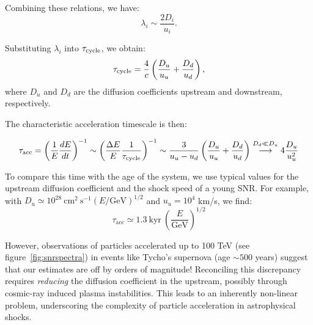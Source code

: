 Combining these relations, we have:
\[
\lambda_i \sim \frac{2 D_i}{u_i}.
\]

Substituting \( \lambda_i \) into \( \tau_{\rm cycle} \), we obtain:
\begin{equation}
\tau_{\rm cycle} = \frac{4}{c} \left( \frac{D_u}{u_u} + \frac{D_d}{u_d} \right),
\end{equation}
where \( D_u \) and \( D_d \) are the diffusion coefficients upstream and downstream, respectively.

The characteristic acceleration timescale is then:
%
\begin{remark}
\begin{equation}
\tau_{\text{acc}} = \left( \frac{1}{E} \frac{dE}{dt} \right)^{-1} \sim \left( \frac{\Delta E}{E} \frac{1}{\tau_{\rm cycle}} \right)^{-1} \sim \frac{3}{u_u - u_d} \left( \frac{D_u}{u_u} + \frac{D_d}{u_d} \right) \oset{D_d \ll D_u}{\longrightarrow} 4 \frac{D_u}{u_u^2}
\end{equation}
\end{remark}

To compare this time with the age of the system, we use typical values for the upstream diffusion coefficient and the shock speed of a young SNR. For example, with \( D_u \simeq 10^{28}~\text{cm}^2~\text{s}^{-1} (E/\text{GeV})^{1/2} \) and \( u_u = 10^4 \) km/s, we find:
%
\begin{equation}
\tau_{\text{acc}} \simeq 1.3~\text{kyr}~\left( \frac{E}{\text{GeV}} \right)^{1/2} 
\end{equation}

However, observations of particles accelerated up to 100 TeV (see figure~\ref{fig:snrspectra}) in events like Tycho's supernova (age \( \sim 500 \) years) suggest that our estimates are off by orders of magnitude! Reconciling this discrepancy requires \emph{reducing} the diffusion coefficient in the upstream, possibly through cosmic-ray induced plasma instabilities. This leads to an inherently non-linear problem, underscoring the complexity of particle acceleration in astrophysical shocks.